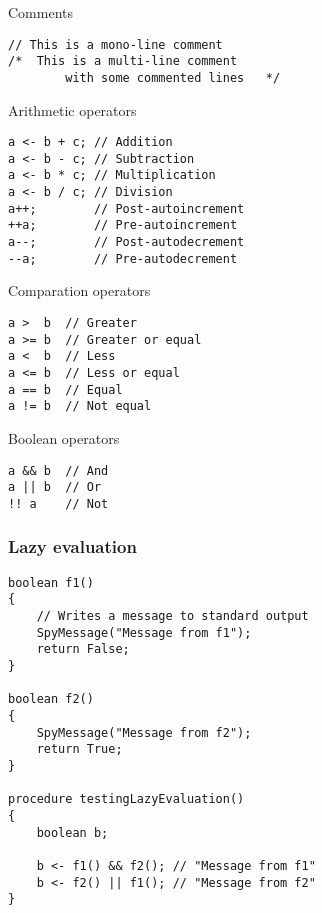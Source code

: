 \documentclass[11pt]{beamer}
\begin{document}
\begin{frame}[fragile]
\begin{block}{Comments}
\small
\begin{lstlisting}[language=lekta]
// This is a mono-line comment
/*	This is a multi-line comment
		with some commented lines	*/
\end{lstlisting}
\end{block}
\pause
{}
\begin{block}{Arithmetic operators}
\begin{lstlisting}[language=lekta]
a <- b + c; // Addition
a <- b - c; // Subtraction
a <- b * c; // Multiplication
a <- b / c; // Division
a++;        // Post-autoincrement
++a;        // Pre-autoincrement
a--;        // Post-autodecrement
--a;        // Pre-autodecrement
\end{lstlisting}
\end{block}
\end{frame}

\begin{frame}[fragile]
\begin{block}{Comparation operators}
\begin{lstlisting}[language=lekta]
a >  b  // Greater
a >= b  // Greater or equal
a <  b  // Less
a <= b  // Less or equal
a == b  // Equal
a != b  // Not equal
\end{lstlisting}
\end{block}
\pause
{}
\begin{block}{Boolean operators}
\begin{lstlisting}[language=lekta]
a && b  // And
a || b  // Or
!! a    // Not
\end{lstlisting}
\end{block}
\end{frame}

\begin{frame}[fragile]
\frametitle{Lazy evaluation}
\scriptsize
\begin{lstlisting}[language=lekta]
boolean f1() 
{
	// Writes a message to standard output
	SpyMessage("Message from f1"); 
	return False;
}

boolean f2() 
{
	SpyMessage("Message from f2"); 
	return True;
}

procedure testingLazyEvaluation() 
{
	boolean b;
	
	b <- f1() && f2(); // "Message from f1"
	b <- f2() || f1(); // "Message from f2"
}
\end{lstlisting}
\end{frame}
\end{document}
